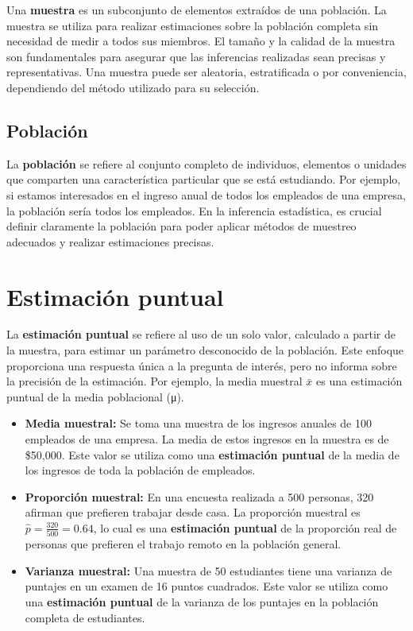 \documentclass[
  letterpaper,
  DIV=11,
  numbers=noendperiod]{scrreprt}
\begin{document}
Una \textbf{muestra} es un subconjunto de elementos extraídos de una
población. La muestra se utiliza para realizar estimaciones sobre la
población completa sin necesidad de medir a todos sus miembros. El
tamaño y la calidad de la muestra son fundamentales para asegurar que
las inferencias realizadas sean precisas y representativas. Una muestra
puede ser aleatoria, estratificada o por conveniencia, dependiendo del
método utilizado para su selección.

\section{Población}\label{poblaciuxf3n-1}

La \textbf{población} se refiere al conjunto completo de individuos,
elementos o unidades que comparten una característica particular que se
está estudiando. Por ejemplo, si estamos interesados en el ingreso anual
de todos los empleados de una empresa, la población sería todos los
empleados. En la inferencia estadística, es crucial definir claramente
la población para poder aplicar métodos de muestreo adecuados y realizar
estimaciones precisas.

\chapter{Estimación puntual}\label{estimaciuxf3n-puntual}

La \textbf{estimación puntual} se refiere al uso de un solo valor,
calculado a partir de la muestra, para estimar un parámetro desconocido
de la población. Este enfoque proporciona una respuesta única a la
pregunta de interés, pero no informa sobre la precisión de la
estimación. Por ejemplo, la media muestral \(\bar{x}\) es una estimación
puntual de la media poblacional (μ).

\begin{itemize}
\item
  \textbf{Media muestral:} Se toma una muestra de los ingresos anuales
  de 100 empleados de una empresa. La media de estos ingresos en la
  muestra es de \$50,000. Este valor se utiliza como una
  \textbf{estimación puntual} de la media de los ingresos de toda la
  población de empleados.
\item
  \textbf{Proporción muestral:} En una encuesta realizada a 500
  personas, 320 afirman que prefieren trabajar desde casa. La proporción
  muestral es \(\hat{p} = \frac{320}{500} = 0.64\), lo cual es una
  \textbf{estimación puntual} de la proporción real de personas que
  prefieren el trabajo remoto en la población general.
\item
  \textbf{Varianza muestral:} Una muestra de 50 estudiantes tiene una
  varianza de puntajes en un examen de 16 puntos cuadrados. Este valor
  se utiliza como una \textbf{estimación puntual} de la varianza de los
  puntajes en la población completa de estudiantes.
\end{itemize}
\end{document}

